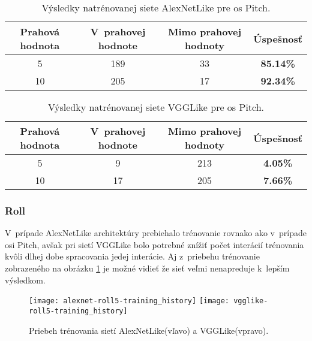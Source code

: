 \begin{table}[H]
    \centering
    \begin{tabular}{|c|c|c|c|}
        \hline
        Prahová hodnota & V~prahovej hodnote       & Mimo prahovej hodnoty    & Úspešnosť    \\ \hline
        5               & {\color[HTML]{009901} 189} & {\color[HTML]{9A0000} 33} & \textbf{85.14\%} \\ \hline
        10              & {\color[HTML]{009901} 205} & {\color[HTML]{9A0000} 17} & \textbf{92.34\%} \\ \hline
    \end{tabular}
    \caption{Výsledky natrénovanej siete AlexNetLike pre os Pitch.}
    \label{tab:alexnetpitchresults}
\end{table}
\begin{table}[H]
    \centering
    \begin{tabular}{|c|c|c|c|}
        \hline
        Prahová hodnota & V~prahovej hodnote       & Mimo prahovej hodnoty    & Úspešnosť    \\ \hline
        5               & {\color[HTML]{009901} 9} & {\color[HTML]{9A0000} 213} & \textbf{4.05\%} \\ \hline
        10              & {\color[HTML]{009901} 17} & {\color[HTML]{9A0000} 205} & \textbf{7.66\%} \\ \hline
    \end{tabular}
    \caption{Výsledky natrénovanej siete VGGLike pre os Pitch.}
    \label{tab:vgglikepitchresults}
\end{table}


\subsubsection{Roll}
V~prípade AlexNetLike architektúry prebiehalo trénovanie rovnako ako v~prípade osi Pitch,
    avšak pri sietí VGGLike bolo potrebné znížiť počet interácií trénovania kvôli dlhej dobe
    spracovania jedej interácie.
Aj z~priebehu trénovanie zobrazeného na obrázku \ref{pic:rollaxis} je možné vidieť že sieť veľmi nenapreduje k~lepším výsledkom.

\begin{figure}[H]
    \centering
    \texttt{[image: alexnet-roll5-training\_history]}
	\texttt{[image: vgglike-roll5-training\_history]}
	\caption{Priebeh trénovania sietí AlexNetLike(vľavo) a VGGLike(vpravo).}
	\label{pic:rollaxis}
\end{figure}


